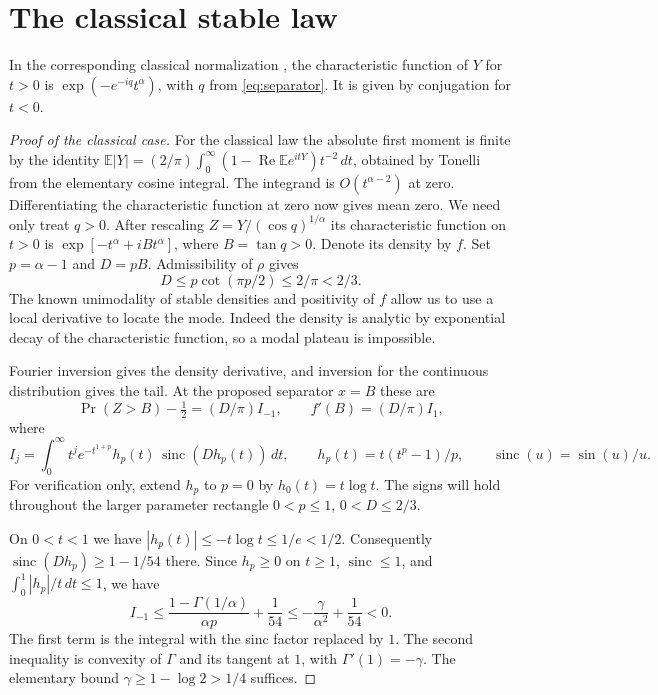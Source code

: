 \documentclass[11pt,a4paper]{article}
\numberwithin{equation}{section}
\renewcommand{\Re}{\operatorname{Re}}\renewcommand{\Im}{\operatorname{Im}}
\begin{document}
\section{The classical stable law}\label{sec:classical}
In the corresponding classical normalization \cite{HK}, the
characteristic function of $Y$ for $t>0$ is
$\exp(-e^{-iq}t^\alpha)$, with $q$ from \eqref{eq:separator}.
It is given by conjugation for $t<0$.
\begin{proof}[Proof of the classical case]
For the classical law the absolute first moment is finite by the identity
$\mathbb E|Y|=(2/\pi)\int_0^\infty(1-\Re\mathbb E e^{itY})t^{-2}\,dt$,
obtained by Tonelli from the elementary cosine integral. The integrand is $O(t^{\alpha-2})$ at zero. Differentiating the characteristic function at zero now gives mean zero. We need only treat $q>0$.
After rescaling $Z=Y/(\cos q)^{1/\alpha}$ its characteristic function on $t>0$ is $\exp[-t^\alpha+iB t^\alpha]$, where $B=\tan q>0$. Denote its density by $f$. Set $p=\alpha-1$ and $D=pB$. Admissibility of $\rho$ gives
\[
 D\le p\cot(\pi p/2)\le2/\pi<2/3.
\]
The known unimodality of stable densities \cite{Simon} and positivity of $f$ allow us to use a local derivative to locate the mode. Indeed the density is analytic by exponential decay of the characteristic function, so a modal plateau is impossible.

Fourier inversion gives the density derivative, and inversion for the continuous distribution gives the tail. At the proposed separator $x=B$ these are
\[
 \Pr(Z>B)-\tfrac12=(D/\pi)I_{-1},\qquad f'(B)=(D/\pi)I_1,
\]
where
\[
 I_j=\int_0^\infty t^j e^{-t^{1+p}}h_p(t)\,\operatorname{sinc}(Dh_p(t))\,dt,
 \qquad h_p(t)=t(t^p-1)/p,\qquad \operatorname{sinc}(u)=\sin(u)/u.
\]
For verification only, extend $h_p$ to $p=0$ by $h_0(t)=t\log t$. The signs will hold throughout the larger parameter rectangle $0<p\le1$, $0<D\le2/3$.

On $0<t<1$ we have $|h_p(t)|\le-t\log t\le1/e<1/2$. Consequently $\operatorname{sinc}(Dh_p)\ge1-1/54$ there. Since $h_p\ge0$ on $t\ge1$, $\operatorname{sinc}\le1$, and $\int_0^1 |h_p|/t\,dt\le1$, we have
\[
 I_{-1}\le \frac{1-\Gamma(1/\alpha)}{\alpha p}+\frac1{54}
 \le-\frac{\gamma}{\alpha^2}+\frac1{54}<0 .
\]
The first term is the integral with the sinc factor replaced by $1$. The second inequality is convexity of $\Gamma$ and its tangent at $1$, with $\Gamma'(1)=-\gamma$. The elementary bound $\gamma\ge1-\log 2>1/4$ suffices.


\end{proof}
\end{document}
